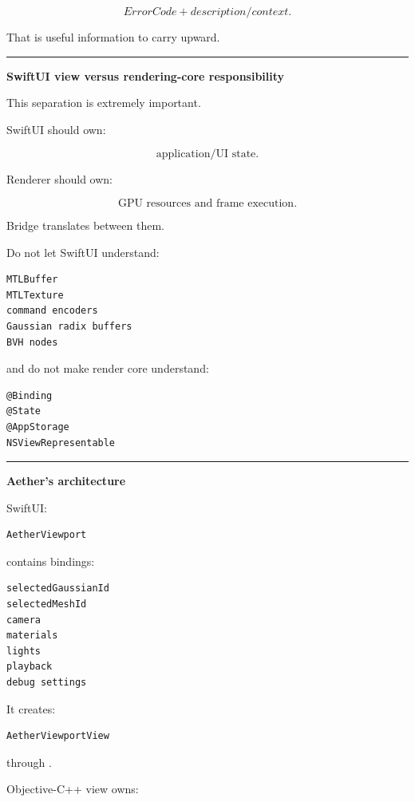\[
ErrorCode
+
description/context.
\]

That is useful information to carry upward.

\begin{center}\rule{0.5\linewidth}{0.5pt}\end{center}

\textbf{SwiftUI view versus rendering-core responsibility}

This separation is extremely important.

SwiftUI should own:

\[
\text{application/UI state}.
\]

Renderer should own:

\[
\text{GPU resources and frame execution}.
\]

Bridge translates between them.

Do not let SwiftUI understand:

\begin{verbatim}
MTLBuffer
MTLTexture
command encoders
Gaussian radix buffers
BVH nodes
\end{verbatim}

and do not make render core understand:

\begin{verbatim}
@Binding
@State
@AppStorage
NSViewRepresentable
\end{verbatim}

\begin{center}\rule{0.5\linewidth}{0.5pt}\end{center}

\textbf{Aether's architecture}

SwiftUI:

\begin{verbatim}
AetherViewport
\end{verbatim}

contains bindings:

\begin{verbatim}
selectedGaussianId
selectedMeshId
camera
materials
lights
playback
debug settings
\end{verbatim}

It creates:

\begin{verbatim}
AetherViewportView
\end{verbatim}

through .

Objective-C++ view owns:

